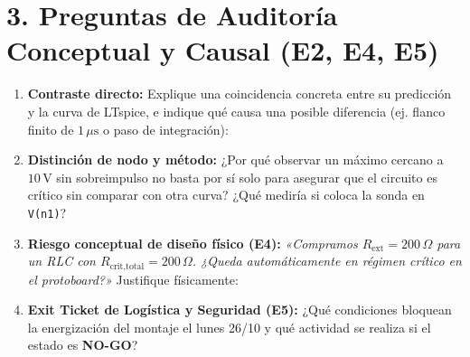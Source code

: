 \documentclass[11pt, a4paper]{article}
\begin{document}
\section*{3. Preguntas de Auditoría Conceptual y Causal (E2, E4, E5)}
\begin{enumerate}\setlength\itemsep{0.45cm}
    \item \textbf{Contraste directo:} Explique una coincidencia concreta entre su predicción y la curva de LTspice, e indique qué causa una posible diferencia (ej. flanco finito de $1\,\mu\text{s}$ o paso de integración): \par\vspace{0.15cm}
    \noindent\hrulefill

    \item \textbf{Distinción de nodo y método:} ¿Por qué observar un máximo cercano a $10\,\text{V}$ sin sobreimpulso no basta por sí solo para asegurar que el circuito es crítico sin comparar con otra curva? ¿Qué mediría si coloca la sonda en \texttt{V(n1)}? \par\vspace{0.15cm}
    \noindent\hrulefill

    \item \textbf{Riesgo conceptual de diseño físico (E4):} \textit{«Compramos $R_{\text{ext}} = 200\,\Omega$ para un RLC con $R_{\text{crit,total}} = 200\,\Omega$. ¿Queda automáticamente en régimen crítico en el protoboard?»} Justifique físicamente: \par\vspace{0.15cm}
    \noindent\hrulefill

    \item \textbf{Exit Ticket de Logística y Seguridad (E5):} ¿Qué condiciones bloquean la energización del montaje el lunes 26/10 y qué actividad se realiza si el estado es \textbf{NO-GO}? \par\vspace{0.15cm}
    \noindent\hrulefill
\end{enumerate}
\end{document}
